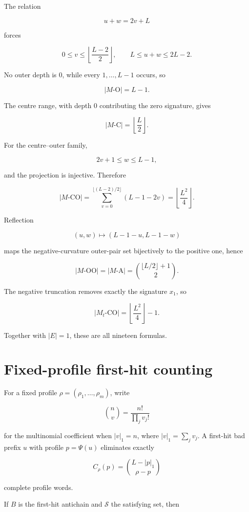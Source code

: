 \documentclass[
  british,
  a4paper,
  11pt]{article}
\begin{document}
The relation

\[
u+w=2v+L
\]

forces

\[
0\le v\le\left\lfloor\frac{L-2}{2}\right\rfloor,
\qquad
L\le u+w\le2L-2.
\]

No outer depth is \(0\), while every \(1,\ldots,L-1\) occurs, so

\[
|M\text{-O}|=L-1.
\]

The centre range, with depth \(0\) contributing the zero signature,
gives

\[
|M\text{-C}|=\left\lfloor\frac L2\right\rfloor.
\]

For the centre--outer family,

\[
2v+1\le w\le L-1,
\]

and the projection is injective. Therefore

\[
|M\text{-CO}|
=
\sum_{v=0}^{\lfloor(L-2)/2\rfloor}(L-1-2v)
=
\left\lfloor\frac{L^2}{4}\right\rfloor.
\]

Reflection

\[
(u,w)\mapsto(L-1-u,L-1-w)
\]

maps the negative-curvature outer-pair set bijectively to the positive
one, hence

\[
|M\text{-OO}|
=
|M\text{-A}|
=
\binom{\lfloor L/2\rfloor+1}{2}.
\]

The negative truncation removes exactly the signature \(x_1\), so

\[
|M_t\text{-CO}|
=
\left\lfloor\frac{L^2}{4}\right\rfloor-1.
\]

Together with \(|E|=1\), these are all nineteen formulas.

\section{Fixed-profile first-hit
counting}\label{fixed-profile-first-hit-counting}

For a fixed profile \(\rho=(\rho_1,\ldots,\rho_m)\), write

\[
\binom{n}{v}
=
\frac{n!}{\prod_j v_j!}
\]

for the multinomial coefficient when \(|v|_1=n\), where
\(|v|_1=\sum_j v_j\). A first-hit bad prefix \(u\) with profile
\(p=\Psi(u)\) eliminates exactly

\[
C_\rho(p)
=
\binom{L-|p|_1}{\rho-p}
\]

complete profile words.

If \(B\) is the first-hit antichain and \(\mathcal S\) the satisfying
set, then
\end{document}
